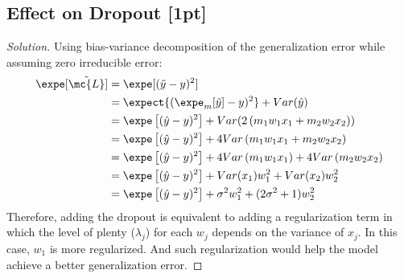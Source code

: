 \documentclass{article}
\begin{document}
	\subsection{Effect on Dropout [1pt]}
	\begin{proof}[Solution]
	Using bias-variance decomposition of the generalization error while assuming zero irreducible error:
		\begin{align}
			\expe[\tilde{\mc{L}}]
			&= \expe [(\tilde{y} - y)^2] \\
			&= \expect{(\expe_m[\tilde{y}] - y)^2}
			+ Var(\hat{y}) \\
			&= \expe \left[(
				\hat{y} - y
			)^2 \right]
			+ Var(2\left(m_{1} w_{1} x_{1}+m_{2} w_{2} x_{2}\right)) \\
			&= \expe \left[(
				\hat{y} - y
			)^2 \right]
			+ 4Var\left(m_{1} w_{1} x_{1}+m_{2} w_{2} x_{2}\right) \\
			&= \expe \left[(
				\hat{y} - y
			)^2 \right]
			+ 4Var\left(m_{1} w_{1} x_{1}\right)
			+ 4Var \left(m_{2} w_{2} x_{2}\right) \\
			&= \expe \left[(
				\hat{y} - y
			)^2 \right]
			+ Var(x_1) w_{1}^2
			+ Var(x_2) w_{2}^2 \\
			&= \expe \left[(
				\hat{y} - y
			)^2 \right]
			+ \sigma^2 w_{1}^2
			+ (2 \sigma^2 + 1) w_{2}^2
		\end{align}
		Therefore, adding the dropout is equivalent to adding a regularization term in which the level of plenty ($\lambda_j$) for each $w_j$ depends on the variance of $x_j$. In this case, $w_1$ is more regularized. And such regularization would help the model achieve a better generalization error.
	\end{proof}
	
\end{document}
